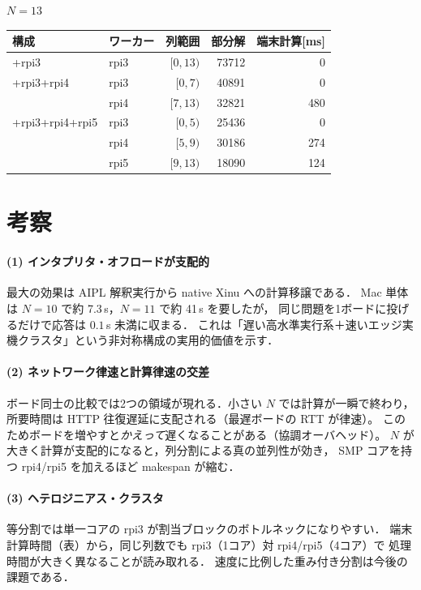 \documentclass[11pt,a4paper]{article}
\begin{document}
\begin{center}
\textbf{$N=13$}\\[2pt]\begin{tabular}{llrrr}
\toprule
構成 & ワーカー & 列範囲 & 部分解 & 端末計算[ms] \\
\midrule
+rpi3 & rpi3 & $[0,13)$ & 73712 & 0 \\
\midrule
+rpi3+rpi4 & rpi3 & $[0,7)$ & 40891 & 0 \\
 & rpi4 & $[7,13)$ & 32821 & 480 \\
\midrule
+rpi3+rpi4+rpi5 & rpi3 & $[0,5)$ & 25436 & 0 \\
 & rpi4 & $[5,9)$ & 30186 & 274 \\
 & rpi5 & $[9,13)$ & 18090 & 124 \\
\bottomrule
\end{tabular}
\end{center}

\section{考察}
\paragraph{(1) インタプリタ・オフロードが支配的}
最大の効果は AIPL 解釈実行から native Xinu への計算移譲である．
Mac 単体は $N{=}10$ で約 7.3\,s，$N{=}11$ で約 41\,s を要したが，
同じ問題を1ボードに投げるだけで応答は $0.1$\,s 未満に収まる．
これは「遅い高水準実行系＋速いエッジ実機クラスタ」という非対称構成の実用的価値を示す．

\paragraph{(2) ネットワーク律速と計算律速の交差}
ボード同士の比較では2つの領域が現れる．小さい $N$ では計算が一瞬で終わり，
所要時間は HTTP 往復遅延に支配される（最遅ボードの RTT が律速）。
このためボードを増やすと\emph{かえって}遅くなることがある（協調オーバヘッド）。
$N$ が大きく計算が支配的になると，列分割による真の並列性が効き，
SMP コアを持つ rpi4/rpi5 を加えるほど makespan が縮む．

\paragraph{(3) ヘテロジニアス・クラスタ}
等分割では単一コアの rpi3 が割当ブロックのボトルネックになりやすい．
端末計算時間（表）から，同じ列数でも rpi3（1コア）対 rpi4/rpi5（4コア）で
処理時間が大きく異なることが読み取れる．
速度に比例した重み付き分割は今後の課題である．
\end{document}
